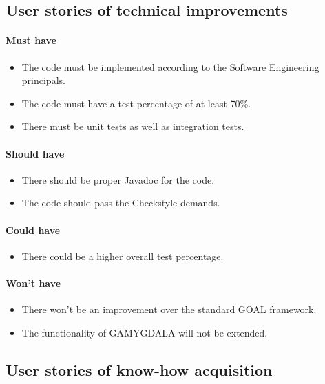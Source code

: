 \subsection{User stories of technical improvements}
\paragraph{Must have} 
\begin{itemize}
\item The code must be implemented according to the Software Engineering principals.
\item The code must have a test percentage of at least 70\%.
\item There must be unit tests as well as integration tests.
\end{itemize}

\paragraph{Should have} 
\begin{itemize}
\item There should be proper Javadoc for the code.
\item The code should pass the Checkstyle demands.
\end{itemize}

\paragraph{Could have} 
\begin{itemize}
\item There could be a higher overall test percentage.
\end{itemize}

\paragraph{Won't have} 
\begin{itemize}
\item There won't be an improvement over the standard GOAL framework.
\item The functionality of GAMYGDALA will not be extended.
\end{itemize}

\subsection{User stories of know-how acquisition}
